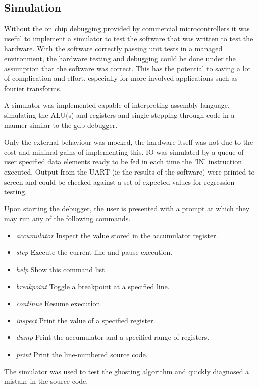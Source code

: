 \subsection{Simulation}
 Without the on chip debugging provided by commercial microcontrollers it was
 useful to implement a simulator to test the software that was written to test
 the hardware. With the software correctly passing unit tests in a managed
 environment, the hardware testing and debugging could be done under the
 assumption that the software was correct. This has the potential to saving a lot
 of complication and effort, especially for more involved applications such as
 fourier transforms.

 A simulator was implemented capable of interpreting assembly language,
 simulating the ALU(s) and registers and single stepping through code in a
 manner similar to the gdb debugger.

 Only the external behaviour was mocked, the hardware itself was not due to the
 cost and minimal gains of implementing this. IO was simulated by a queue of
 user specified data elements ready to be fed in each time the 'IN' instruction
 executed. Output from the UART (ie the results of the software) were printed to
 screen and could be checked against a set of expected values for regression
 testing.

 Upon starting the debugger, the user is presented with a prompt at which they
 may run any of the following commands.
 \begin{itemize}
    \item \emph{accumulator} Inspect the value stored in the accumulator register.
    \item \emph{step} Execute the current line and pause execution.
    \item \emph{help} Show this command list.
    \item \emph{breakpoint} Toggle a breakpoint at a specified line.
    \item \emph{continue} Resume execution.
    \item \emph{inspect} Print the value of a specified register.
    \item \emph{dump} Print the accumulator and a specified range of registers.
    \item \emph{print} Print the line-numbered source code.
 \end{itemize}

 The simulator was used to test the ghosting algorithm and quickly diagnosed a
 mistake in the source code.
